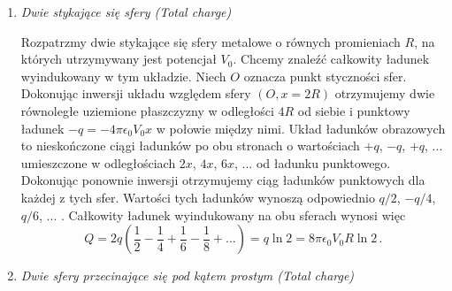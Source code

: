 \documentclass[../main.tex]{subfiles}
\begin{document}
\begin{enumerate}
     \item \textit{Dwie stykające się sfery (Total charge)}
     \medskip
     
     Rozpatrzmy dwie stykające się sfery metalowe o równych promieniach \(R\), na których utrzymywany jest potencjał \(V_0\). Chcemy znaleźć całkowity ładunek wyindukowany w tym układzie. Niech \(O\) oznacza punkt styczności sfer. Dokonując inwersji układu względem sfery \((O,x=2R)\) otrzymujemy dwie równoległe uziemione płaszczyzny w odległości \(4R\) od siebie i punktowy ładunek \(-q=-4\pi\epsilon_0V_0x\) w połowie między nimi. Układ ładunków obrazowych to nieskończone ciągi ładunków po obu stronach o wartościach \(+q\), \(-q\), \(+q\), ... umieszczone w odległościach \(2x\), \(4x\), \(6x\), ... od ładunku punktowego. Dokonując ponownie inwersji otrzymujemy ciąg ładunków punktowych dla każdej z tych sfer. Wartości tych ładunków wynoszą odpowiednio \(q/2\), \(-q/4\), \(q/6\), ... . Całkowity ładunek wyindukowany na obu sferach wynosi więc
     \begin{equation*}
         Q=2q\left(\frac{1}{2}-\frac{1}{4}+\frac{1}{6}-\frac{1}{8}+...\right)=q\ln 2=8\pi\epsilon_0 V_0R\ln 2\,.
     \end{equation*}
    
    \item \textit{Dwie sfery przecinające się pod kątem prostym (Total charge)}
    \medskip
    

\end{enumerate}
\end{document}
